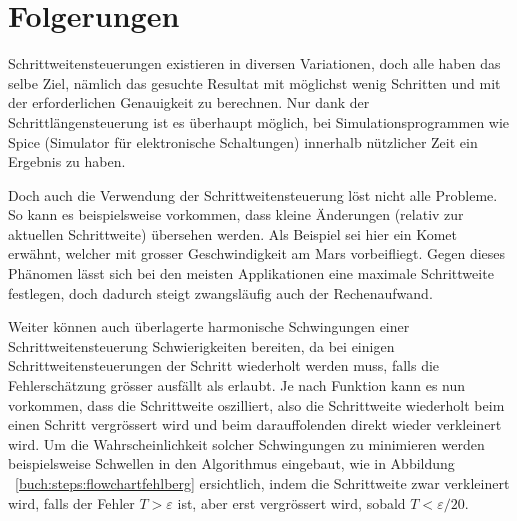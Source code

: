 %
%
%
\section{Folgerungen
\label{steps:section:folgerungen}}
Schrittweitensteuerungen existieren in diversen Variationen, doch alle haben das selbe Ziel, nämlich
das gesuchte Resultat mit möglichst wenig Schritten und mit der erforderlichen Genauigkeit zu berechnen.
Nur dank der Schrittlängensteuerung ist es überhaupt möglich, bei Simulationsprogrammen wie Spice (Simulator für elektronische Schaltungen)
innerhalb nützlicher Zeit ein Ergebnis zu haben.

Doch auch die Verwendung der Schrittweitensteuerung löst nicht alle Probleme.
So kann es beispielsweise vorkommen, dass kleine Änderungen (relativ zur aktuellen Schrittweite) übersehen werden.
Als Beispiel sei hier ein Komet erwähnt, welcher mit grosser Geschwindigkeit am Mars vorbeifliegt.
Gegen dieses Phänomen lässt sich bei den meisten Applikationen eine maximale Schrittweite festlegen,
doch dadurch steigt zwangsläufig auch der Rechenaufwand.

Weiter können auch überlagerte harmonische Schwingungen einer Schrittweitensteuerung Schwierigkeiten bereiten,
da bei einigen Schrittweitensteuerungen der Schritt wiederholt werden muss,
falls die Fehlerschätzung grösser ausfällt als erlaubt. Je nach Funktion kann es nun vorkommen,
dass die Schrittweite oszilliert, also die Schrittweite wiederholt beim einen Schritt vergrössert wird und beim darauffolenden direkt wieder verkleinert wird.
Um die Wahrscheinlichkeit solcher Schwingungen zu minimieren werden beispielsweise Schwellen in den Algorithmus eingebaut,
wie in Abbildung ~\ref{buch:steps:flowchartfehlberg} ersichtlich, indem die Schrittweite zwar verkleinert wird,
falls der Fehler $T > \varepsilon$ ist, aber erst vergrössert wird, sobald $T < \varepsilon / 20$.

